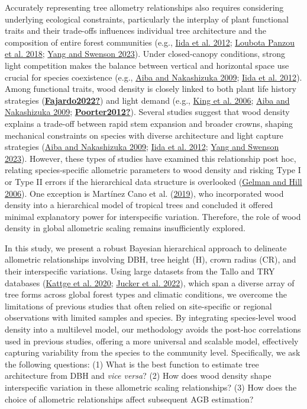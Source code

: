 \documentclass[
  12pt,
  letterpaper,
  DIV=11,
  numbers=noendperiod]{scrartcl}
\begin{document}
Accurately representing tree allometry relationships also requires
considering underlying ecological constraints, particularly the
interplay of plant functional traits and their trade-offs influences
individual tree architecture and the composition of entire forest
communities (e.g., \protect\hyperlink{ref-Iida2012}{Iida et al. 2012};
\protect\hyperlink{ref-LoubotaPanzou2018}{Loubota Panzou et al. 2018};
\protect\hyperlink{ref-Yang2023}{Yang and Swenson 2023}). Under
closed-canopy conditions, strong light competition makes the balance
between vertical and horizontal space use crucial for species
coexistence (e.g., \protect\hyperlink{ref-Aiba2009}{Aiba and Nakashizuka
2009}; \protect\hyperlink{ref-Iida2012}{Iida et al. 2012}). Among
functional traits, wood density is closely linked to both plant life
history strategies
(\protect\hyperlink{ref-Fajardo2022}{\textbf{Fajardo2022?}}) and light
demand (e.g., \protect\hyperlink{ref-King2006}{King et al. 2006};
\protect\hyperlink{ref-Aiba2009}{Aiba and Nakashizuka 2009};
\protect\hyperlink{ref-Poorter2012}{\textbf{Poorter2012?}}). Several
studies suggest that wood density explains a trade-off between rapid
stem expansion and broader crowns, shaping mechanical constraints on
species with diverse architecture and light capture strategies
(\protect\hyperlink{ref-Aiba2009}{Aiba and Nakashizuka 2009};
\protect\hyperlink{ref-Iida2012}{Iida et al. 2012};
\protect\hyperlink{ref-Yang2023}{Yang and Swenson 2023}). However, these
types of studies have examined this relationship post hoc, relating
species-specific allometric parameters to wood density and risking Type
I or Type II errors if the hierarchical data structure is overlooked
(\protect\hyperlink{ref-Gelman2006}{Gelman and Hill 2006}). One
exception is Martínez Cano et al.
(\protect\hyperlink{ref-MartinezCano2019}{2019}), who incorporated wood
density into a hierarchical model of tropical trees and concluded it
offered minimal explanatory power for interspecific variation.
Therefore, the role of wood density in global allometric scaling remains
insufficiently explored.

In this study, we present a robust Bayesian hierarchical approach to
delineate allometric relationships involving DBH, tree height (H), crown
radius (CR), and their interspecific variations. Using large datasets
from the Tallo and TRY databases
(\protect\hyperlink{ref-Kattge2020}{Kattge et al. 2020};
\protect\hyperlink{ref-Jucker2022}{Jucker et al. 2022}), which span a
diverse array of tree forms across global forest types and climatic
conditions, we overcome the limitations of previous studies that often
relied on site-specific or regional observations with limited samples
and species. By integrating species-level wood density into a multilevel
model, our methodology avoids the post-hoc correlations used in previous
studies, offering a more universal and scalable model, effectively
capturing variability from the species to the community level.
Specifically, we ask the following questions: (1) What is the best
function to estimate tree architecture from DBH and \emph{vice versa}?
(2) How does wood density shape interspecific variation in these
allometric scaling relationships? (3) How does the choice of allometric
relationships affect subsequent AGB estimation?
\end{document}
